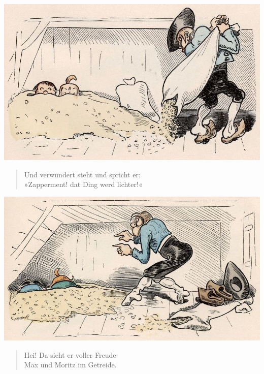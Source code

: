 \documentclass[a4paper,12pt]{article}
\begin{document}
\begin{center}\includegraphics[scale=.7, alt={... und werden lichter}]{images/7-04.jpg}\end{center}



\begin{verse}
Und verwundert steht und spricht er:\\{}
»Zapperment! dat Ding werd lichter!«
\end{verse}



\begin{center}\includegraphics[scale=.7, alt={Voller Freude}]{images/7-05.jpg}\end{center}



\begin{verse}
Hei! Da sieht er voller Freude\\{}
Max und Moritz im Getreide.
\end{verse}
\end{document}
